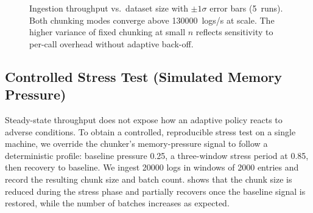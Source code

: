 \documentclass[preprint,12pt]{elsarticle}
\begin{document}
\begin{figure}[t]
\centering
{}
\caption{Ingestion throughput vs.\ dataset size with $\pm 1\sigma$ error bars (5~runs).
Both chunking modes converge above \SI{130000}{logs/s} at scale.
The higher variance of fixed chunking at small $n$ reflects sensitivity to per-call overhead without adaptive back-off.}
\label{fig:throughput}
\end{figure}

\subsection{Controlled Stress Test (Simulated Memory Pressure)}
\label{sec:stress}

Steady-state throughput does not expose how an adaptive policy reacts to adverse conditions.
To obtain a controlled, reproducible stress test on a single machine, we override the chunker's memory-pressure signal to follow a deterministic profile: baseline pressure 0.25, a three-window stress period at 0.85, then recovery to baseline.
We ingest \num{20000} logs in windows of \num{2000} entries and record the resulting chunk size and batch count.
 shows that the chunk size is reduced during the stress phase and partially recovers once the baseline signal is restored, while the number of batches increases as expected.
\end{document}

